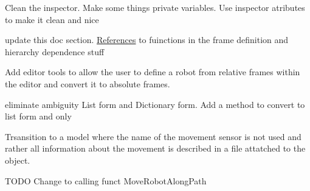 \begin{DoxyRefList}
Clean the inspector. Make some things private variables. Use inspector atributes to make it clean and nice

\label{todo__todo000008}%
%
update this doc section. \mbox{\hyperlink{class_references}{References}} to fuinctions in the frame definition and hierarchy dependence stuff

\label{todo__todo000009}%
%
Add editor tools to allow the user to define a robot from relative frames within the editor and convert it to absolute frames. 
\item[Class \mbox{\hyperlink{class_movement}{Movement}} ]\label{todo__todo000010}%
%
eliminate ambiguity List form and Dictionary form. Add a method to convert to list form and only  
\item[Member \mbox{\hyperlink{class_robot_script_aaaacc0eacd09c68f0e399dfb780c16a3}{Robot\+Script.Get\+Possible\+Movement\+Sensors}} ()]\label{todo__todo000011}%
%
Trsansition to a model where the name of the movement sensor is not used and rather all information about the movement is described in a file attatched to the object. ~\newline
  
\item[Member \mbox{\hyperlink{class_robot_script_a9213947f626c88acf4ce793020a9ef3d}{Robot\+Script.Move\+To\+Node}} (Game\+Object End\+Node)]\label{todo__todo000012}%
%
TODO Change to calling funct Move\+Robot\+Along\+Path 
\end{DoxyRefList}